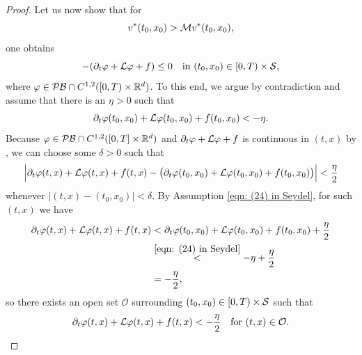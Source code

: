 \begin{proof}
    Let us now show that for
    \begin{equation}
        v^* (t_0,x_0) > \mathcal{M} v^*(t_0,x_0),
        \label{eqn: Theorem 4.8, initial assumption}
    \end{equation}
    one obtains
    \begin{equation*}
        - (\partial_t \varphi + \mathcal{L} \varphi + f) \leq 0 \quad \text{in }(t_0,x_0) \in [0,T) \times \mathcal{S},
        \label{eqn: Theorem 4.8, main goal subsolution part}
    \end{equation*}
    where $\varphi \in \mathcal{PB} \cap C^{1,2}([0,T) \times \mathbb{R}^d)$. To this end, we argue by contradiction and assume that there is an $\eta > 0$ such that 
    \begin{equation}
        \partial_t \varphi(t_0,x_0) + \mathcal{L} \varphi(t_0,x_0) + f(t_0,x_0) < - \eta.
        \label{eqn: (24) in Seydel}
    \end{equation}
    Because $\varphi \in \mathcal{PB} \cap C^{1,2}([0,T] \times \mathbb{R}^d)$ and $\partial_t \varphi + \mathcal{L} \varphi + f$ is continuous in $(t,x)$ by , we can choose some $\delta > 0$ such that 
    \begin{equation*}
        \Big| \partial_t \varphi (t,x) + \mathcal{L} \varphi (t,x) + f(t,x) - \big( \partial_t \varphi (t_0,x_0) + \mathcal{L} \varphi (t_0,x_0) + f(t_0,x_0) \big) \Big| < \frac \eta 2
    \end{equation*}
    whenever $|(t,x) - (t_0,x_0)| < \delta$. By Assumption \eqref{eqn: (24) in Seydel}, for such $(t,x)$ we have 
    \begin{align*}
        \partial_t \varphi (t,x) + \mathcal{L} \varphi (t,x) + f(t,x) & < \partial_t \varphi (t_0,x_0) + \mathcal{L} \varphi (t_0,x_0) + f(t_0,x_0) + \frac{\eta}{2} \\
        &\overset{\eqref{eqn: (24) in Seydel}}{<} - \eta +\frac{\eta}{2} \\
        &= -\frac{\eta}{2},
    \end{align*}
    so there exists an open set $\mathcal O$ surrounding $(t_0,x_0) \in [0,T) \times \mathcal{S}$ such that 
    \begin{equation}
        \partial_t \varphi (t,x) + \mathcal{L} \varphi (t,x) + f(t,x) < - \frac{\eta}{2} \quad \text{for } (t,x) \in \mathcal{O}. 
        \label{eqn: Theorem 4.8, temporary result 4}
    \end{equation}


\end{proof}
